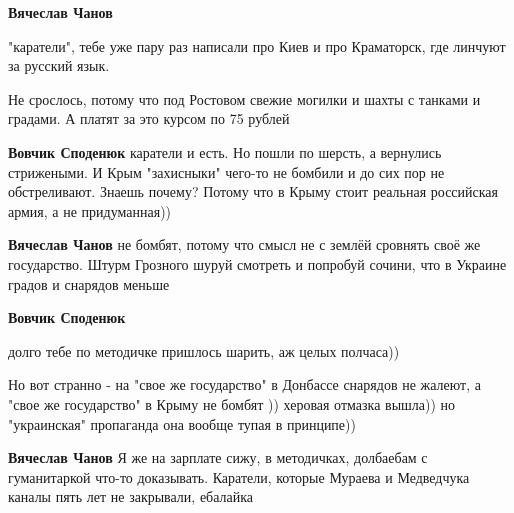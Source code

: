 \begin{itemize}
\begin{itemize}
\textbf{Вячеслав Чанов} 

"каратели", тебе уже пару раз написали про Киев и про Краматорск, где линчуют
за русский язык.

Не срослось, потому что под Ростовом свежие могилки и шахты с танками и
градами. А платят за это курсом по 75 рублей

 
\textbf{Вовчик Споденюк} каратели и есть. Но пошли по шерсть, а вернулись
стрижеными. И Крым "захисныки" чего-то не бомбили и до сих пор не обстреливают.
Знаешь почему? Потому что в Крыму стоит реальная российская армия, а не
придуманная))

 
\textbf{Вячеслав Чанов} не бомбят, потому что смысл не с землёй сровнять своё же государство. Штурм Грозного шуруй смотреть и попробуй сочини, что в Украине градов и снарядов меньше

 
\textbf{Вовчик Споденюк} 

долго тебе по методичке пришлось шарить, аж целых полчаса))

Но вот странно - на "свое же государство" в Донбассе снарядов не жалеют, а
"свое же государство" в Крыму не бомбят )) херовая отмазка вышла)) но
"украинская" пропаганда она вообще тупая в принципе))

 
\textbf{Вячеслав Чанов} Я же на зарплате сижу, в методичках, долбаебам с гуманитаркой что-то доказывать. Каратели, которые Мураева и Медведчука каналы пять лет не закрывали, ебалайка


\end{itemize}
\end{itemize}

